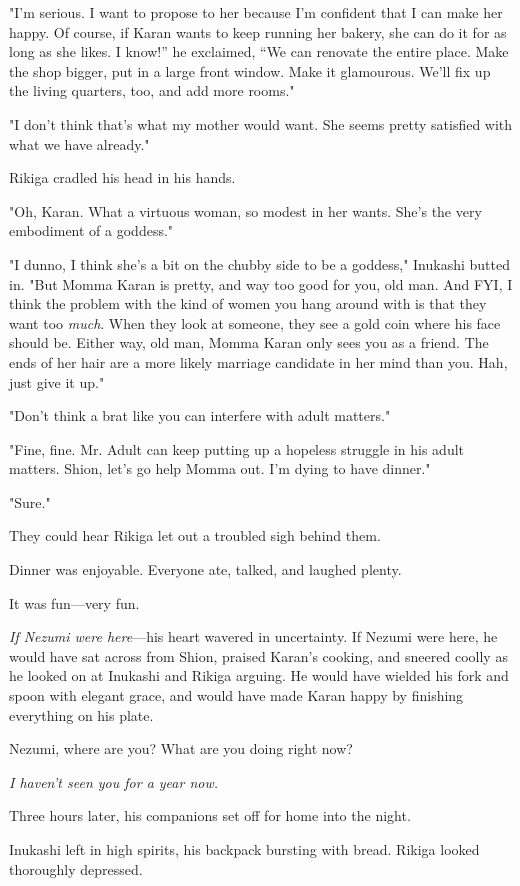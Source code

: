 "I'm serious. I want to propose to her because I'm confident that I can
make her happy. Of course, if Karan wants to keep running her bakery,
she can do it for as long as she likes. I know!'' he exclaimed, ``We can
renovate the entire place. Make the shop bigger, put in a large front
window. Make it glamourous. We'll fix up the living quarters, too, and
add more rooms."

"I don't think that's what my mother would want. She seems pretty
satisfied with what we have already."

Rikiga cradled his head in his hands.

"Oh, Karan. What a virtuous woman, so modest in her wants.
She's the very embodiment of a goddess."

"I dunno, I think she's a bit on the chubby side to be a goddess,"
Inukashi butted in. "But Momma Karan is pretty, and way too good for
you, old man. And FYI, I think the problem with the kind of women you
hang around with is that they want too \emph{much}. When they look at someone,
they see a gold coin where his face should be. Either way, old man,
Momma Karan only sees you as a friend. The ends of her hair are a more
likely marriage candidate in her mind than you. Hah, just give it up."

"Don't think a brat like you can interfere with adult matters."

"Fine, fine. Mr. Adult can keep putting up a hopeless struggle in his
adult matters. Shion, let's go help Momma out. I'm dying to have
dinner."

"Sure."

They could hear Rikiga let out a troubled sigh behind them.

Dinner was enjoyable. Everyone ate, talked, and laughed plenty.

It was fun---very fun.

\emph{If Nezumi were here}---his heart wavered in uncertainty. If Nezumi were
here, he would have sat across from Shion, praised Karan's cooking, and
sneered coolly as he looked on at Inukashi and Rikiga arguing. He would
have wielded his fork and spoon with elegant grace, and would have made
Karan happy by finishing everything on his plate.

Nezumi, where are you? What are you doing right now?

\emph{I haven't seen you for a year now.}

Three hours later, his companions set off for home into the night.

Inukashi left in high spirits, his backpack bursting with bread. Rikiga
looked thoroughly depressed.

